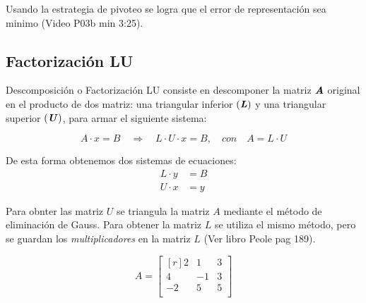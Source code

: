 \documentclass[../main.tex]{subfiles}
\begin{document}
            Usando la estrategia de pivoteo se logra que el error de representación sea minimo (Video P03b min 3:25).
    \subsection{Factorización LU}
        Descomposición o Factorización LU consiste en descomponer la matriz $\textbf{\textit{A}}$ original en el producto de dos matriz: una triangular inferior $(\textbf{\textit{L}})$ y una triangular superior $(\textbf{\textit{U}})$, para armar el siguiente sistema:

        \begin{equation}
            A \cdot x = B \quad \Rightarrow \quad L \cdot U \cdot x = B, \quad con \quad A = L \cdot U
        \end{equation}

        De esta forma obtenemos dos sistemas de ecuaciones:
        \begin{equation}
            \begin{split}
                L \cdot y &= B\\
                U \cdot x &= y
            \end{split}
        \end{equation}

        Para obnter las matriz $\textit{U}$ se triangula la matriz $\textit{A}$ mediante el método de eliminación de Gauss. Para obtener la matriz $\textit{L}$ se utiliza el mismo método, pero se guardan los \textit{multiplicadores} en la matriz $\textit{L}$ (Ver libro Peole pag 189).

        \begin{equation}
            A = \begin{bmatrix*}[r]
                    2 & 1 & 3 \\
                    4 & -1 & 3 \\
                    -2 & 5 & 5 \\
                \end{bmatrix*}
        \end{equation}
\end{document}
